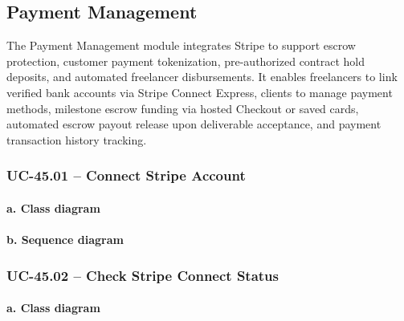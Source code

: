 
\subsection{Payment Management}

The Payment Management module integrates Stripe to support escrow protection, customer payment tokenization, pre-authorized contract hold deposits, and automated freelancer disbursements. It enables freelancers to link verified bank accounts via Stripe Connect Express, clients to manage payment methods, milestone escrow funding via hosted Checkout or saved cards, automated escrow payout release upon deliverable acceptance, and payment transaction history tracking.

\subsubsection{UC-45.01 -- Connect Stripe Account}

\paragraph*{a. Class diagram}

\paragraph*{b. Sequence diagram}

\subsubsection{UC-45.02 -- Check Stripe Connect Status}

\paragraph*{a. Class diagram}

